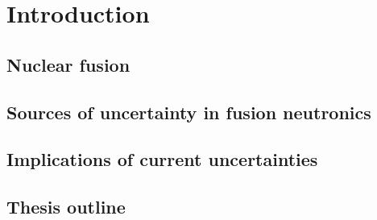 
\chapter{Introduction} %

\ifpdf
    \graphicspath{{Chapter0/Figs/Raster/}{Chapter0/Figs/PDF/}{Chapter0/Figs/}}
\else
    \graphicspath{{Chapter0/Figs/Vector/}{Chapter0/Figs/}}
\fi

\section{Nuclear fusion}

\section{Sources of uncertainty in fusion neutronics}

\section{Implications of current uncertainties}

\section{Thesis outline}
